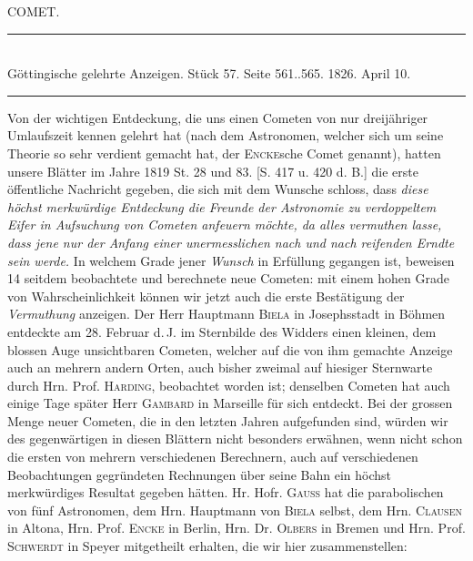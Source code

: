 \clearpage
{}
\hypertarget{native-456-comet}{}
\begin{center}
{\large COMET.}
\end{center}

\begin{center}
\rule{6cm}{0.4pt}\\
Göttingische gelehrte Anzeigen. Stück 57. Seite 561..565. 1826. April 10.\\
\rule{6cm}{0.4pt}
\end{center}

Von der wichtigen Entdeckung, die uns einen Cometen von nur dreijähriger
Umlaufszeit kennen gelehrt hat (nach dem Astronomen, welcher sich um seine
Theorie so sehr verdient gemacht hat, der
\textsc{Encke}sche Comet genannt), hatten unsere Blätter im Jahre 1819 St. 28 und 83.
[S. 417 u. 420 d. B.] die erste öffentliche Nachricht gegeben, die sich mit
dem Wunsche schloss, dass \emph{diese höchst merkwürdige Entdeckung die
Freunde der Astronomie zu verdoppeltem Eifer in Aufsuchung von Cometen
anfeuern möchte, da alles vermuthen lasse, dass jene nur der Anfang einer
unermesslichen nach und nach reifenden Erndte sein werde.} In welchem Grade
jener \emph{Wunsch} in Erfüllung gegangen ist, beweisen 14 seitdem
beobachtete und berechnete neue Cometen: mit einem hohen Grade von
Wahrscheinlichkeit können wir jetzt auch die erste Bestätigung der
\emph{Vermuthung} anzeigen. Der Herr Hauptmann \textsc{Biela} in Josephsstadt in
Böhmen entdeckte am 28. Februar d.\,J. im Sternbilde des Widders einen
kleinen, dem blossen Auge unsichtbaren Cometen, welcher auf die von ihm
gemachte Anzeige auch an mehrern andern Orten, auch bisher zweimal auf
hiesiger Sternwarte durch Hrn. Prof. \textsc{Harding}, beobachtet worden ist;
denselben Cometen hat auch einige Tage später Herr \textsc{Gambard} in Marseille für
sich entdeckt. Bei der grossen Menge neuer Cometen, die in den letzten Jahren
aufgefunden sind, würden wir des gegenwärtigen in diesen Blättern nicht
besonders erwähnen, wenn nicht schon die ersten von mehrern verschiedenen
Berechnern, auch auf verschiedenen Beobachtungen gegründeten Rechnungen über
seine Bahn ein höchst merkwürdiges Resultat gegeben hätten. Hr. Hofr. \textsc{Gauss}
hat die parabolischen von fünf Astronomen, dem Hrn. Hauptmann von \textsc{Biela}
selbst, dem Hrn. \textsc{Clausen} in Altona, Hrn. Prof. \textsc{Encke} in Berlin, Hrn.
Dr. \textsc{Olbers} in Bremen und Hrn. Prof. \textsc{Schwerdt} in Speyer mitgetheilt erhalten,
die wir hier zusammenstellen:

